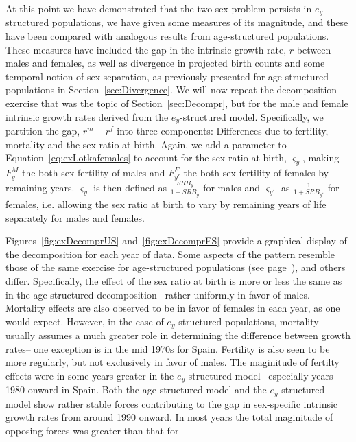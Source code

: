  \FloatBarrier
At this point we have demonstrated that the two-sex problem persists in
$e_y$-structured populations, we have given some measures of its
magnitude, and these have been compared with analogous results from
age-structured populations. These measures have included the gap in the
intrinsic growth rate, $r$ between males and females, as well as
divergence in projected birth counts and some
temporal notion of sex separation, as previously
presented for age-structured populations in Section~\ref{sec:Divergence}. We
will now repeat the decomposition exercise that was the topic of
 Section~\ref{sec:Decompr}, but for the male and female intrinsic growth rates 
 derived from the $e_y$-structured model. Specifically, we partition the 
 gap, $r^m-r^f$ into three components: Differences due to fertility, 
 mortality and the sex
ratio at birth. Again, we add a parameter to Equation~\eqref{eq:exLotkafemales}
to account for the sex ratio at birth, $\varsigma _{y}$, making $F_{y}^M$
the both-sex fertility of males and $F_{y'}^F$ the both-sex fertility of females
by remaining years. $\varsigma _{y}$ is then defined as $\frac{SRB_y}{1+SRB_y}$
for males and $\varsigma _{y'}$ as $\frac{1}{1+SRB_{y'}}$ for females, i.e.
allowing the sex ratio at birth to vary by remaining years of life separately 
for males and females.

Figures~\ref{fig:exDecomprUS} and~\ref{fig:exDecomprES} provide a graphical
display of the decomposition for each year of data. Some
aspects of the pattern resemble those of the same exercise for age-structured 
populations (see page~\pageref{fig:DecomprUS}), and others differ.
Specifically, the effect of the sex ratio at birth is more or less the same as
in the age-structured decomposition-- rather uniformly in favor of males.
Mortality effects are also observed to be in favor of females in each year, as
one would expect. However, in the case of $e_y$-structured populations,
mortality usually assumes a much greater role in determining the difference between growth
rates-- one exception is in the mid 1970s for Spain. Fertility is also seen to
be more regularly, but not exclusively in favor of males. The maginitude of
fertilty effects were in some years greater in the $e_y$-structured model--
especially years 1980 onward in Spain. Both the age-structured model and the
$e_y$-structured model show rather stable forces contributing to the gap in
sex-specific intrinsic growth rates from around 1990 onward. In most years the
total maginitude of opposing forces was greater than that for

